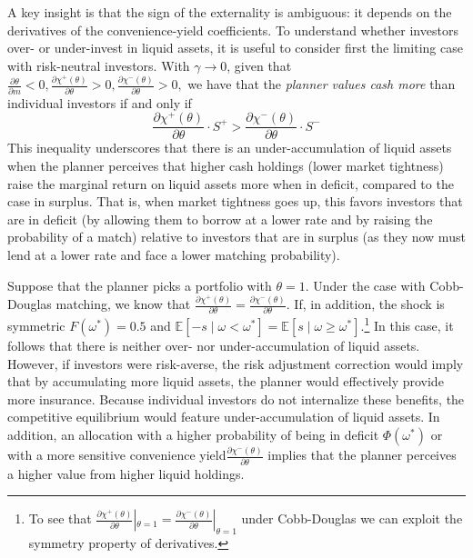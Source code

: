 \documentclass[12pt,american,english,notitlepage]{article}
\begin{document}
A key insight is that the sign of the externality is ambiguous: it depends on the derivatives of the convenience-yield coefficients.  To understand whether investors over- or under-invest in liquid assets, it is useful to consider first the limiting case with risk-neutral investors. With $\gamma\rightarrow0$, given that $\frac{\partial\theta}{\partial m}<0,\frac{\partial\chi^{+}(\theta)}{\partial\theta}>0,\frac{\partial\chi^{-}(\theta)}{\partial\theta}>0,$
we have that the \textit{planner values cash more} than individual
investors if and only if
\begin{equation}
\frac{\partial\chi^{+}(\theta)}{\partial\theta}\cdot S^{+}>\frac{\partial\chi^{-}(\theta)}{\partial\theta}\cdot S^{-}
\end{equation}
This inequality underscores that there is an under-accumulation of liquid assets when the planner perceives that higher cash holdings (lower market tightness) raise the marginal return on liquid  assets more when in deficit, compared to the case in surplus. That is, when market tightness goes up, this favors investors that are in deficit  (by allowing them to borrow at a lower rate and by raising the probability of a match) relative to investors that are in surplus (as they now must lend at a lower rate and face a lower matching probability).

Suppose that the planner picks a portfolio with $\theta=1$. Under
the case with Cobb-Douglas matching, we know that $\frac{\partial\chi^{+}(\theta)}{\partial\theta}=\frac{\partial\chi^{-}(\theta)}{\partial\theta}$.
If, in addition, the shock is symmetric $F(\omega^{\ast})=0.5$ and $\mathbb{E}\left[-s\mid\omega<\omega^{\ast}\right]=\mathbb{E}\left[s\mid\omega\ge\omega^{\ast}\right]$.\footnote{To see that $\frac{\partial\chi^{+}(\theta)}{\partial\theta}|_{\theta=1}=\frac{\partial\chi^{-}(\theta)}{\partial\theta}|_{\theta=1}$
under Cobb-Douglas we can exploit the symmetry property of derivatives.} In this case, it follows that there is neither over- nor under-accumulation
of liquid assets. However, if investors were risk-averse, the risk adjustment correction would imply that by accumulating more liquid
assets, the planner would effectively provide more insurance. Because individual investors do not internalize these benefits, the competitive
equilibrium would feature under-accumulation of liquid assets. In addition, 
an allocation with a higher probability of being in deficit $\Phi(\omega^{\ast})$
or with a more sensitive convenience yield$\frac{\partial\chi^{-}(\theta)}{\partial\theta}$
implies that the planner perceives a higher value from higher liquid holdings.
\end{document}
